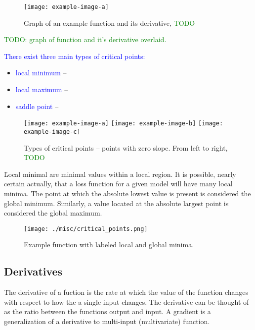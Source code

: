 \begin{figure}
	\centering
	\texttt{[image: example-image-a]}\hfil
	\caption{Graph of an example function and its derivative, \textcolor{green}{TODO}}
	\label{fig:calc_fn_deriv}
\end{figure}
\textcolor{green}{TODO: graph of function and it's derivative overlaid.}

\textcolor{blue}{There exist three main types of critical points:}

\begin{itemize}
	\item \textcolor{blue}{local minimum} -- 
	\item \textcolor{blue}{local maximum} -- 
	\item \textcolor{blue}{saddle point} -- 
\end{itemize}


\begin{figure}[htp]
	\centering
	\texttt{[image: example-image-a]}\hfil
	\texttt{[image: example-image-b]}\hfil
	\texttt{[image: example-image-c]}
\caption{Types of critical points -- points with zero slope. From left to right, \textcolor{green}{TODO}}
\label{fig:calc_critical_points}
\end{figure}



\r{Local minimal are minimal values within a local region. It is possible, nearly certain actually, that a loss function for a given model will have many local minima. The point at which the absolute lowest value is present is considered the {global minimum}. Similarly, a value located at the absolute largest point is considered the {global maximum}. }

\begin{figure}
	\centering
	\texttt{[image: ./misc/critical\_points.png]}\hfil
	\caption{Example function with labeled local and global minima.}
	\label{fig:calc_fn_deriv}
\end{figure}

\subsection{Derivatives}

\r{The derivative of a fuction is the rate at which the value of the function changes with respect to how the a single input changes. The derivative can be thought of as the ratio between the functions output and input. A gradient is a generalization of a derivative to multi-input (multivariate) function.}

